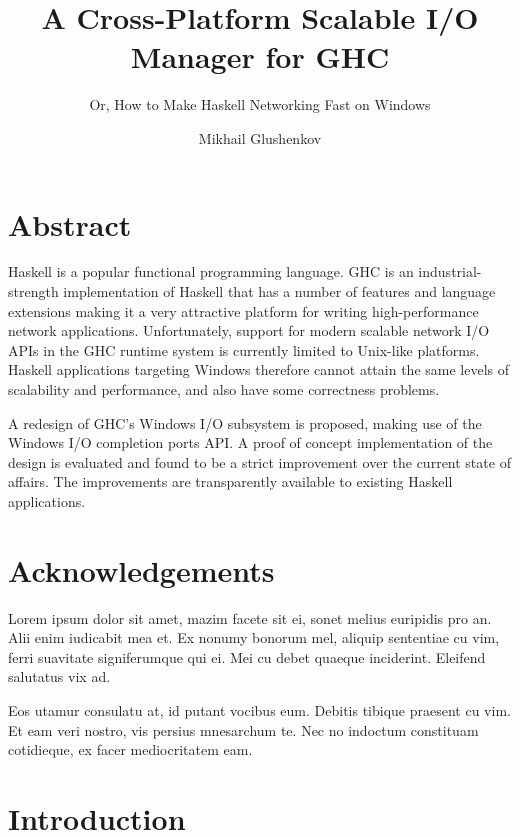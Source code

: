 \documentclass[a4paper,11pt,oneside]{report}
\title{A Cross-Platform Scalable I/O Manager for GHC}
\subtitle{Or, How to Make Haskell Networking Fast on Windows}
\author{Mikhail Glushenkov}
\begin{document}
\maketitle

\chapter*{Abstract}
Haskell is a popular functional programming language. GHC is an
industrial-strength implementation of Haskell that has a number of features and
language extensions making it a very attractive platform for writing
high-performance network applications. Unfortunately, support for modern
scalable network I/O APIs in the GHC runtime system is currently limited to
Unix-like platforms. Haskell applications targeting Windows therefore cannot
attain the same levels of scalability and performance, and also have some
correctness problems.

A redesign of GHC's Windows I/O subsystem is proposed, making use of the Windows
I/O completion ports API. A proof of concept implementation of the design is
evaluated and found to be a strict improvement over the current state of
affairs. The improvements are transparently available to existing Haskell
applications.

\pagebreak

\chapter*{Acknowledgements}

Lorem ipsum dolor sit amet, mazim facete sit ei, sonet melius euripidis pro
an. Alii enim iudicabit mea et. Ex nonumy bonorum mel, aliquip sententiae cu
vim, ferri suavitate signiferumque qui ei. Mei cu debet quaeque
inciderint. Eleifend salutatus vix ad.

Eos utamur consulatu at, id putant vocibus eum. Debitis tibique praesent cu
vim. Et eam veri nostro, vis persius mnesarchum te. Nec no indoctum constituam
cotidieque, ex facer mediocritatem eam.

\pagebreak


\tableofcontents

\pagebreak

\pagestyle{fancy}
\setcounter{page}{1}

\chapter{Introduction}
\end{document}
